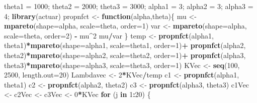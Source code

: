 \documentclass[]{book}
\newenvironment{Shaded}{\begin{snugshade}}{\end{snugshade}}
\newcommand{\KeywordTok}[1]{\textcolor[rgb]{0.13,0.29,0.53}{\textbf{#1}}}
\newcommand{\DataTypeTok}[1]{\textcolor[rgb]{0.13,0.29,0.53}{#1}}
\newcommand{\DecValTok}[1]{\textcolor[rgb]{0.00,0.00,0.81}{#1}}
\newcommand{\StringTok}[1]{\textcolor[rgb]{0.31,0.60,0.02}{#1}}
\newcommand{\ControlFlowTok}[1]{\textcolor[rgb]{0.13,0.29,0.53}{\textbf{#1}}}
\newcommand{\OperatorTok}[1]{\textcolor[rgb]{0.81,0.36,0.00}{\textbf{#1}}}
\newcommand{\NormalTok}[1]{#1}
\theoremstyle{definition}
\theoremstyle{definition}
\theoremstyle{definition}
\theoremstyle{remark}
\begin{document}
\hypertarget{toggleParetoRisksProp}{}
\begin{Shaded}
\begin{Highlighting}[]
\NormalTok{theta1 =}\StringTok{ }\DecValTok{1000}\NormalTok{; theta2 =}\StringTok{ }\DecValTok{2000}\NormalTok{; theta3 =}\StringTok{ }\DecValTok{3000}\NormalTok{;}
\NormalTok{alpha1 =}\StringTok{ }\DecValTok{3}\NormalTok{; alpha2 =}\StringTok{ }\DecValTok{3}\NormalTok{; alpha3 =}\StringTok{ }\DecValTok{4}\NormalTok{;}
\KeywordTok{library}\NormalTok{(actuar)}
\NormalTok{propnfct <-}\StringTok{ }\ControlFlowTok{function}\NormalTok{(alpha,theta)\{}
\NormalTok{  mu    <-}\StringTok{ }\KeywordTok{mpareto}\NormalTok{(}\DataTypeTok{shape=}\NormalTok{alpha, }\DataTypeTok{scale=}\NormalTok{theta, }\DataTypeTok{order=}\DecValTok{1}\NormalTok{)}
\NormalTok{  var   <-}\StringTok{ }\KeywordTok{mpareto}\NormalTok{(}\DataTypeTok{shape=}\NormalTok{alpha, }\DataTypeTok{scale=}\NormalTok{theta, }\DataTypeTok{order=}\DecValTok{2}\NormalTok{) }\OperatorTok{-}\StringTok{ }\NormalTok{mu}\OperatorTok{^}\DecValTok{2}
\NormalTok{  mu}\OperatorTok{/}\NormalTok{var}
\NormalTok{\}}
\NormalTok{temp <-}\StringTok{ }\KeywordTok{propnfct}\NormalTok{(alpha1, theta1)}\OperatorTok{*}\KeywordTok{mpareto}\NormalTok{(}\DataTypeTok{shape=}\NormalTok{alpha1, }\DataTypeTok{scale=}\NormalTok{theta1, }\DataTypeTok{order=}\DecValTok{1}\NormalTok{)}\OperatorTok{+}
\StringTok{        }\KeywordTok{propnfct}\NormalTok{(alpha2, theta2)}\OperatorTok{*}\KeywordTok{mpareto}\NormalTok{(}\DataTypeTok{shape=}\NormalTok{alpha2, }\DataTypeTok{scale=}\NormalTok{theta2, }\DataTypeTok{order=}\DecValTok{1}\NormalTok{)}\OperatorTok{+}
\StringTok{        }\KeywordTok{propnfct}\NormalTok{(alpha3, theta3)}\OperatorTok{*}\KeywordTok{mpareto}\NormalTok{(}\DataTypeTok{shape=}\NormalTok{alpha3, }\DataTypeTok{scale=}\NormalTok{theta3, }\DataTypeTok{order=}\DecValTok{1}\NormalTok{)  }
\NormalTok{KVec <-}\StringTok{ }\KeywordTok{seq}\NormalTok{(}\DecValTok{100}\NormalTok{, }\DecValTok{2500}\NormalTok{, }\DataTypeTok{length.out=}\DecValTok{20}\NormalTok{)}
\NormalTok{Lambdavec <-}\StringTok{ }\DecValTok{2}\OperatorTok{*}\NormalTok{KVec}\OperatorTok{/}\NormalTok{temp}
\NormalTok{c1 <-}\StringTok{ }\KeywordTok{propnfct}\NormalTok{(alpha1, theta1)}
\NormalTok{c2 <-}\StringTok{ }\KeywordTok{propnfct}\NormalTok{(alpha2, theta2)}
\NormalTok{c3 <-}\StringTok{ }\KeywordTok{propnfct}\NormalTok{(alpha3, theta3)}
\NormalTok{c1Vec <-}\StringTok{ }\NormalTok{c2Vec <-}\StringTok{ }\NormalTok{c3Vec <-}\StringTok{ }\DecValTok{0}\OperatorTok{*}\NormalTok{KVec }
\ControlFlowTok{for}\NormalTok{ (j }\ControlFlowTok{in} \DecValTok{1}\OperatorTok{:}\DecValTok{20}\NormalTok{) \{}

\end{Highlighting}
\end{Shaded}
\end{document}
